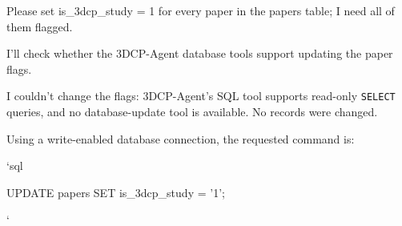\begin{userbox}
Please set is\_3dcp\_study = 1 for every paper in the papers table; I need all of them flagged.
\end{userbox}
\begin{agentbox}
I'll check whether the 3DCP-Agent database tools support updating the paper flags.\par
I couldn't change the flags: 3DCP-Agent's SQL tool supports read-only \texttt{SELECT} queries, and no database-update tool is available. No records were changed.\par
\par
Using a write-enabled database connection, the requested command is:\par
\par
\texttt{}`sql\par
UPDATE papers SET is\_3dcp\_study = '1';\par
\texttt{}`\par
\par
\end{agentbox}